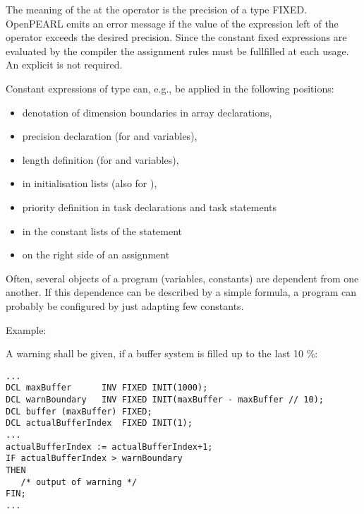 \begin{grammarframe}
\end{grammarframe}

The meaning of the  at the  operator
is the precision of a type FIXED.
OpenPEARL emits an error message if the value of the expression left of 
the 
operator  exceeds the desired precision.
Since the constant fixed expressions are evaluated by the compiler 
the assignment rules must be fullfilled at each usage. An explicit  
is not required.

Constant expressions of type  can, e.g., be applied in the
following positions:
\begin{itemize}
\item denotation of dimension boundaries in array declarations,
\item precision declaration (for  and  variables),
\item length definition (for  and  variables),
\item in initialisation lists (also for ),
\item priority definition in task declarations and task statements
\item in the constant lists of the  statement
\item on the right side of an assignment
\end{itemize}

Often, several objects of a program (variables, constants) are dependent
from one another. If this dependence can be described by a simple
formula, a program can probably be configured by just adapting few
constants.

Example:

A warning shall be given, if a buffer system is filled up to the last 10
\%:

\begin{lstlisting}
...
DCL maxBuffer      INV FIXED INIT(1000); 
DCL warnBoundary   INV FIXED INIT(maxBuffer - maxBuffer // 10);
DCL buffer (maxBuffer) FIXED;
DCL actualBufferIndex  FIXED INIT(1);
... 
actualBufferIndex := actualBufferIndex+1;
IF actualBufferIndex > warnBoundary 
THEN 
   /* output of warning */ 
FIN;
...
\end{lstlisting}
